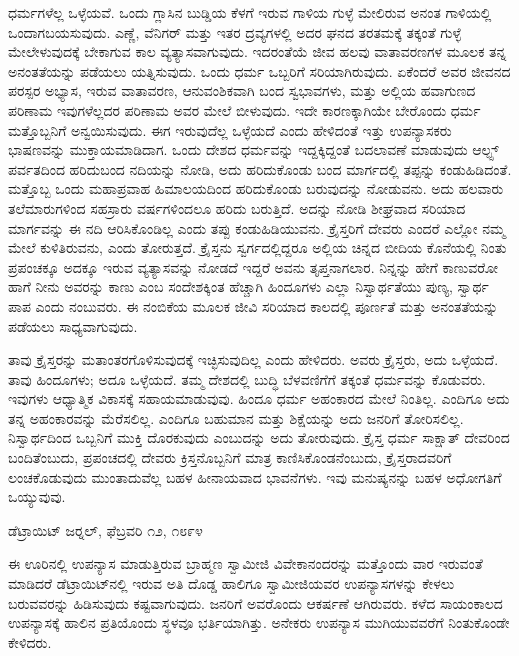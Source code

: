  ಧರ್ಮಗಳೆಲ್ಲ ಒಳ್ಳೆಯವೆ. ಒಂದು ಗ್ಲಾಸಿನ ಬುಡ್ಡಿಯ ಕೆಳಗೆ ಇರುವ ಗಾಳಿಯ ಗುಳ್ಳೆ ಮೇಲಿರುವ ಅನಂತ ಗಾಳಿಯಲ್ಲಿ ಒಂದಾಗಬಯಸುವುದು. ಎಣ್ಣೆ, ವೆನಿಗರ್ ಮತ್ತು ಇತರ ದ್ರವ್ಯಗಳಲ್ಲಿ ಅದರ ಘನದ ತರತಮಕ್ಕೆ ತಕ್ಕಂತೆ ಗುಳ್ಳೆ ಮೇಲೇಳುವುದಕ್ಕೆ ಬೇಕಾಗುವ ಕಾಲ ವ್ಯತ್ಯಾಸವಾಗುವುದು. ಇದರಂತೆಯೆ ಜೀವ ಹಲವು ವಾತಾವರಣಗಳ ಮೂಲಕ ತನ್ನ ಅನಂತತೆಯನ್ನು ಪಡೆಯಲು ಯತ್ನಿಸುವುದು. ಒಂದು ಧರ್ಮ ಒಬ್ಬರಿಗೆ ಸರಿಯಾಗಿರುವುದು. ಏಕೆಂದರೆ ಅವರ ಜೀವನದ ಪರಸ್ಪರ ಅಭ್ಯಾಸ, ಇರುವ ವಾತಾವರಣ, ಆನುವಂಶಿಕವಾಗಿ ಬಂದ ಸ್ವಭಾವಗಳು, ಮತ್ತು ಅಲ್ಲಿಯ ಹವಾಗುಣದ ಪರಿಣಾಮ ಇವುಗಳೆಲ್ಲದರ ಪರಿಣಾಮ ಅವರ ಮೇಲೆ ಬೀಳುವುದು. ಇದೇ ಕಾರಣಕ್ಕಾಗಿಯೇ ಬೇರೊಂದು ಧರ್ಮ ಮತ್ತೊಬ್ಬನಿಗೆ ಅನ್ವಯಿಸುವುದು. ಈಗ ಇರುವುದೆಲ್ಲ ಒಳ್ಳೆಯದೆ ಎಂದು ಹೇಳಿದಂತೆ ಇತ್ತು ಉಪನ್ಯಾಸಕರು ಭಾಷಣವನ್ನು ಮುಕ್ತಾಯಮಾಡಿದಾಗ. ಒಂದು ದೇಶದ ಧರ್ಮವನ್ನು ಇದ್ದಕ್ಕಿದ್ದಂತೆ ಬದಲಾವಣೆ ಮಾಡುವುದು ಆಲ್ಫ್ಸ್ ಪರ್ವತದಿಂದ ಹರಿದುಬಂದ ನದಿಯನ್ನು ನೋಡಿ, ಅದು ಹರಿದುಕೊಂಡು ಬಂದ ಮಾರ್ಗದಲ್ಲಿ ತಪ್ಪನ್ನು ಕಂಡುಹಿಡಿದಂತೆ. ಮತ್ತೊಬ್ಬ ಒಂದು ಮಹಾಪ್ರವಾಹ ಹಿಮಾಲಯದಿಂದ ಹರಿದುಕೊಂಡು ಬರುವುದನ್ನು ನೋಡುವನು. ಅದು ಹಲವಾರು ತಲೆಮಾರುಗಳಿಂದ ಸಹಸ್ರಾರು ವರ್ಷಗಳಿಂದಲೂ ಹರಿದು ಬರುತ್ತಿದೆ. ಅದನ್ನು ನೋಡಿ ಶೀಘ್ರವಾದ ಸರಿಯಾದ ಮಾರ್ಗವನ್ನು ಈ ನದಿ ಆರಿಸಿಕೊಂಡಿಲ್ಲ ಎಂದು ತಪ್ಪು ಕಂಡುಹಿಡಿಯುವನು. ಕ್ರೈಸ್ತರಿಗೆ ದೇವರು ಎಂದರೆ ಎಲ್ಲೋ ನಮ್ಮ ಮೇಲೆ ಕುಳಿತಿರುವನು, ಎಂದು ತೋರುತ್ತದೆ. ಕ್ರೈಸ್ತನು ಸ್ವರ್ಗದಲ್ಲಿದ್ದರೂ ಅಲ್ಲಿಯ ಚಿನ್ನದ ಬೀದಿಯ ಕೊನೆಯಲ್ಲಿ ನಿಂತು ಪ್ರಪಂಚಕ್ಕೂ ಅದಕ್ಕೂ ಇರುವ ವ್ಯತ್ಯಾಸವನ್ನು ನೋಡದೆ ಇದ್ದರೆ ಅವನು ತೃಪ್ತನಾಗಲಾರ. ನಿನ್ನನ್ನು ಹೇಗೆ ಕಾಣುವರೋ ಹಾಗೆ ನೀನು ಅವರನ್ನು ಕಾಣು ಎಂಬ ಸಂದೇಶಕ್ಕಿಂತ ಹೆಚ್ಚಾಗಿ ಹಿಂದೂಗಳು ಎಲ್ಲಾ ನಿಸ್ವಾರ್ಥತೆಯು ಪುಣ್ಯ, ಸ್ವಾರ್ಥ ಪಾಪ ಎಂದು ನಂಬುವರು. ಈ ನಂಬಿಕೆಯ ಮೂಲಕ ಜೀವಿ ಸರಿಯಾದ ಕಾಲದಲ್ಲಿ ಪೂರ್ಣತೆ ಮತ್ತು ಅನಂತತೆಯನ್ನು ಪಡೆಯಲು ಸಾಧ್ಯವಾಗುವುದು. 

 ತಾವು ಕ್ರೈಸ್ತರನ್ನು ಮತಾಂತರಗೊಳಿಸುವುದಕ್ಕೆ ಇಚ್ಛಿಸುವುದಿಲ್ಲ ಎಂದು ಹೇಳಿದರು. ಅವರು ಕ್ರೈಸ್ತರು, ಅದು ಒಳ್ಳೆಯದೆ. ತಾವು ಹಿಂದೂಗಳು; ಅದೂ ಒಳ್ಳೆಯದೆ. ತಮ್ಮ ದೇಶದಲ್ಲಿ ಬುದ್ಧಿ ಬೆಳವಣಿಗೆಗೆ ತಕ್ಕಂತೆ ಧರ್ಮವನ್ನು ಕೊಡುವರು. ಇವುಗಳು ಆಧ್ಯಾತ್ಮಿಕ ವಿಕಾಸಕ್ಕೆ ಸಹಾಯಮಾಡುವುವು. ಹಿಂದೂ ಧರ್ಮ ಅಹಂಕಾರದ ಮೇಲೆ ನಿಂತಿಲ್ಲ. ಎಂದಿಗೂ ಅದು ತನ್ನ ಅಹಂಕಾರವನ್ನು ಮೆರೆಸಲಿಲ್ಲ. ಎಂದಿಗೂ ಬಹುಮಾನ ಮತ್ತು ಶಿಕ್ಷೆಯನ್ನು ಅದು ಜನರಿಗೆ ತೋರಿಸಲಿಲ್ಲ. ನಿಸ್ವಾರ್ಥದಿಂದ ಒಬ್ಬನಿಗೆ ಮುಕ್ತಿ ದೊರಕುವುದು ಎಂಬುದನ್ನು ಅದು ತೋರುವುದು. ಕ್ರೈಸ್ತ ಧರ್ಮ ಸಾಕ್ಷಾತ್ ದೇವರಿಂದ ಬಂದಿತೆಂಬುದು, ಪ್ರಪಂಚದಲ್ಲಿ ದೇವರು ಕ್ರಿಸ್ತನೊಬ್ಬನಿಗೆ ಮಾತ್ರ ಕಾಣಿಸಿಕೊಂಡನೆಂಬುದು, ಕ್ರೈಸ್ತರಾದವರಿಗೆ ಲಂಚಕೊಡುವುದು ಮುಂತಾದುವೆಲ್ಲ ಬಹಳ ಹೀನಾಯವಾದ ಭಾವನೆಗಳು. ಇವು ಮನುಷ್ಯನನ್ನು ಬಹಳ ಅಧೋಗತಿಗೆ ಒಯ್ಯುವುವು.

\begin{flushright}
ಡೆಟ್ರಾಯಿಟ್ ಜರ‍್ನಲ್, ಫೆಬ್ರವರಿ ೧೨, ೧೮೯೪
\end{flushright}

 ಈ ಊರಿನಲ್ಲಿ ಉಪನ್ಯಾಸ ಮಾಡುತ್ತಿರುವ ಬ್ರಾಹ್ಮಣ ಸ್ವಾಮೀಜಿ ವಿವೇಕಾನಂದರನ್ನು ಮತ್ತೊಂದು ವಾರ ಇರುವಂತೆ ಮಾಡಿದರೆ ಡೆಟ್ರಾಯಿಟ್‍ನಲ್ಲಿ ಇರುವ ಅತಿ ದೊಡ್ಡ ಹಾಲಿಗೂ ಸ್ವಾಮೀಜಿಯವರ ಉಪನ್ಯಾಸಗಳನ್ನು ಕೇಳಲು ಬರುವವರನ್ನು ಹಿಡಿಸುವುದು ಕಷ್ಟವಾಗುವುದು. ಜನರಿಗೆ ಅವರೊಂದು ಆಕರ್ಷಣೆ ಆಗಿರುವರು. ಕಳೆದ ಸಾಯಂಕಾಲದ ಉಪನ್ಯಾಸಕ್ಕೆ ಹಾಲಿನ ಪ್ರತಿಯೊಂದು ಸ್ಥಳವೂ ಭರ್ತಿಯಾಗಿತ್ತು. ಅನೇಕರು ಉಪನ್ಯಾಸ ಮುಗಿಯುವವರೆಗೆ ನಿಂತುಕೊಂಡೇ ಕೇಳಿದರು. 

